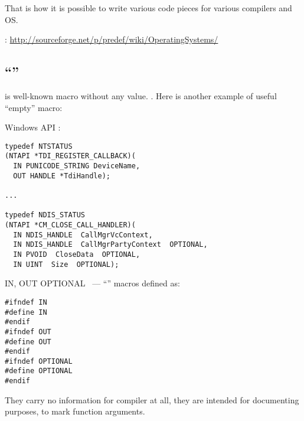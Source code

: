 {That is how it is possible to write various code pieces for various compilers and} \ac{OS}.

:
\url{http://sourceforge.net/p/predef/wiki/OperatingSystems/}

\subsection{``'' }

{ is well-known macro without any value}.
.
{Here is another example of useful ``empty'' macro}:

 Windows API :

\begin{lstlisting}
typedef NTSTATUS
(NTAPI *TDI_REGISTER_CALLBACK)(
  IN PUNICODE_STRING DeviceName,
  OUT HANDLE *TdiHandle);

...

typedef NDIS_STATUS
(NTAPI *CM_CLOSE_CALL_HANDLER)(
  IN NDIS_HANDLE  CallMgrVcContext,
  IN NDIS_HANDLE  CallMgrPartyContext  OPTIONAL,
  IN PVOID  CloseData  OPTIONAL,
  IN UINT  Size  OPTIONAL);
\end{lstlisting}

IN, OUT \AndENRU OPTIONAL ~---  ``'' 
{macros defined as}:

\begin{lstlisting}
#ifndef IN
#define IN
#endif
#ifndef OUT
#define OUT
#endif
#ifndef OPTIONAL
#define OPTIONAL
#endif
\end{lstlisting}

{They carry no information for compiler at all, they are intended for documenting purposes,
to mark function arguments}.

\subsection{}

